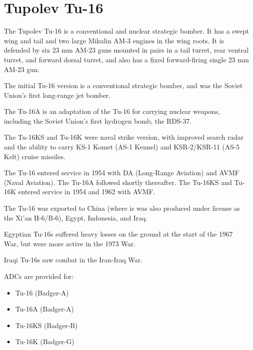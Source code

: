 \section*{Tupolev Tu-16}

The Tupolev Tu-16 is a conventional and nuclear strategic bomber. It has a swept wing and tail and two large Mikulin AM-3 engines in the wing roots. It is defended by six 23 mm AM-23 guns mounted in pairs in a tail turret, rear ventral turret, and forward dorsal turret, and also has a fixed forward-firing single 23 mm AM-23 gun.

The initial Tu-16 version is a conventional strategic bomber, and was the Soviet Union's first long-range jet bomber.

The Tu-16A is an adaptation of the Tu-16 for carrying nuclear weapons, including the Soviet Union's first hydrogen bomb, the RDS-37.

The Tu-16KS and Tu-16K were naval strike version, with improved search radar and the ability to carry KS-1 Komet (AS-1 Kennel) and KSR-2/KSR-11 (AS-5 Kelt) cruise missiles.

The Tu-16 entered service in 1954 with DA (Long-Range Aviation) and AVMF (Naval Aviation). The Tu-16A followed shortly thereafter. The Tu-16KS and Tu-16K entered service in 1954 and 1962 with AVMF.

The Tu-16 was exported to China (where is was also produced under license as the Xi'an H-6/B-6), Egypt, Indonesia, and Iraq.

Egyptian Tu-16s suffered heavy losses on the ground at the start of the 1967 War, but were more active in the 1973 War.

Iraqi Tu-16s saw combat in the Iran-Iraq War.

ADCs are provided for:
\begin{itemize}
    \item Tu-16 (Badger-A)
    \item Tu-16A (Badger-A)
    \item Tu-16KS (Badger-B)
    \item Tu-16K (Badger-G)
\end{itemize}